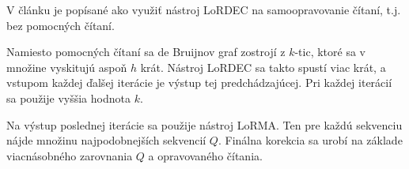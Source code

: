 V článku \citep{salmela2016accurate} je popísané ako využiť nástroj LoRDEC na samoopravovanie čítaní, t.j. bez pomocných čítaní. 

Namiesto pomocných čítaní sa de Bruijnov graf zostrojí z $k$-tic, ktoré sa v množine vyskitujú aspoň $h$ krát. Nástroj LoRDEC sa takto spustí viac krát, a vstupom každej ďalšej iterácie je výstup tej predchádzajúcej. Pri každej iterácií sa použije vyššia hodnota $k$.

Na výstup poslednej iterácie sa použije nástroj LoRMA. Ten pre každú sekvenciu nájde množinu najpodobnejších sekvencií $Q$. Finálna korekcia sa urobí na základe viacnásobného zarovnania $Q$ a opravovaného čítania.